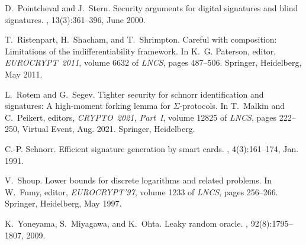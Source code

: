 \begin{thebibliography}{10}
D.~Pointcheval and J.~Stern.
\newblock Security arguments for digital signatures and blind signatures.
, 13(3):361--396, June 2000.

T.~Ristenpart, H.~Shacham, and T.~Shrimpton.
\newblock Careful with composition: Limitations of the indifferentiability
  framework.
\newblock In K.~G. Paterson, editor, {\em EUROCRYPT~2011}, volume 6632 of {\em
  {LNCS}}, pages 487--506. Springer, Heidelberg, May 2011.

L.~Rotem and G.~Segev.
\newblock Tighter security for schnorr identification and signatures: {A}
  high-moment forking lemma for {$\varSigma$}-protocols.
\newblock In T.~Malkin and C.~Peikert, editors, {\em CRYPTO~2021, Part~I},
  volume 12825 of {\em {LNCS}}, pages 222--250, Virtual Event, Aug. 2021.
  Springer, Heidelberg.

C.-P. Schnorr.
\newblock Efficient signature generation by smart cards.
, 4(3):161--174, Jan. 1991.

V.~Shoup.
\newblock Lower bounds for discrete logarithms and related problems.
\newblock In W.~Fumy, editor, {\em EUROCRYPT'97}, volume 1233 of {\em {LNCS}},
  pages 256--266. Springer, Heidelberg, May 1997.

K.~Yoneyama, S.~Miyagawa, and K.~Ohta.
\newblock Leaky random oracle.
, 92(8):1795--1807, 2009.

\end{thebibliography}
